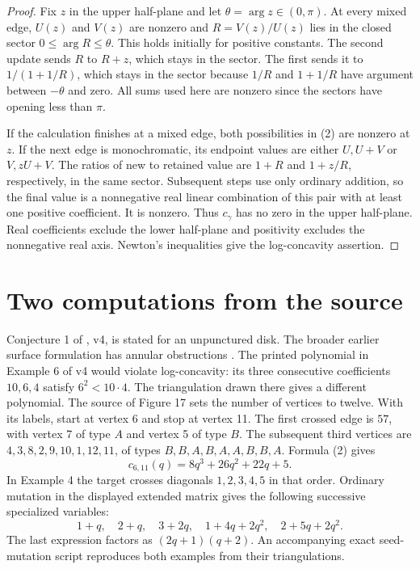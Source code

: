 \documentclass[11pt]{article}
\begin{document}
\begin{proof}
Fix $z$ in the upper half-plane and let $\theta=\arg z\in(0,\pi)$.
At every mixed edge, $U(z)$ and $V(z)$ are nonzero and
$R=V(z)/U(z)$ lies in the closed sector $0\le\arg R\le\theta$.
This holds initially for positive constants. The second update sends $R$ to
$R+z$, which stays in the sector. The first sends it to $1/(1+1/R)$,
which stays in the sector because $1/R$ and $1+1/R$ have argument between
$-\theta$ and zero. All sums used here are nonzero since the sectors have
opening less than $\pi$.

If the calculation finishes at a mixed edge, both possibilities in (2) are
nonzero at $z$. If the next edge is monochromatic, its endpoint values are
either $U,U+V$ or $V,zU+V$. The ratios of new to retained value are $1+R$
and $1+z/R$, respectively, in the same sector. Subsequent steps use only
ordinary addition, so the final value is a nonnegative real linear combination
of this pair with at least one positive coefficient. It is nonzero. Thus
$c_\gamma$ has no zero in the upper half-plane. Real coefficients exclude the
lower half-plane and positivity excludes the nonnegative real axis. Newton's
inequalities give the log-concavity assertion.
\end{proof}

\section*{Two computations from the source}
Conjecture 1 of \cite{kll}, v4, is stated for an unpunctured disk. The broader
earlier surface formulation has annular obstructions \cite{tang,tilepe}.
The printed polynomial in Example 6 of v4 would violate log-concavity:
its three consecutive coefficients $10,6,4$ satisfy $6^2<10\cdot4$.
The triangulation drawn there gives a different polynomial. The source
of Figure 17 sets the number of vertices to twelve. With its labels,
start at vertex 6 and stop at vertex 11. The first crossed edge is $57$,
with vertex 7 of type $A$ and vertex 5 of type $B$. The subsequent third
vertices are $4,3,8,2,9,10,1,12,11$, of types $B,B,A,B,A,A,B,B,A$.
Formula (2) gives
\[
               c_{6,11}(q)=8q^3+26q^2+22q+5.
\]
In Example 4 the target crosses diagonals $1,2,3,4,5$ in that order.
Ordinary mutation in the displayed extended matrix gives the following
successive specialized variables:
\[
 1+q,\quad 2+q,\quad 3+2q,\quad 1+4q+2q^2,\quad 2+5q+2q^2.
\]
The last expression factors as $(2q+1)(q+2)$. An accompanying exact
seed-mutation script reproduces both examples from their triangulations.
\end{document}
